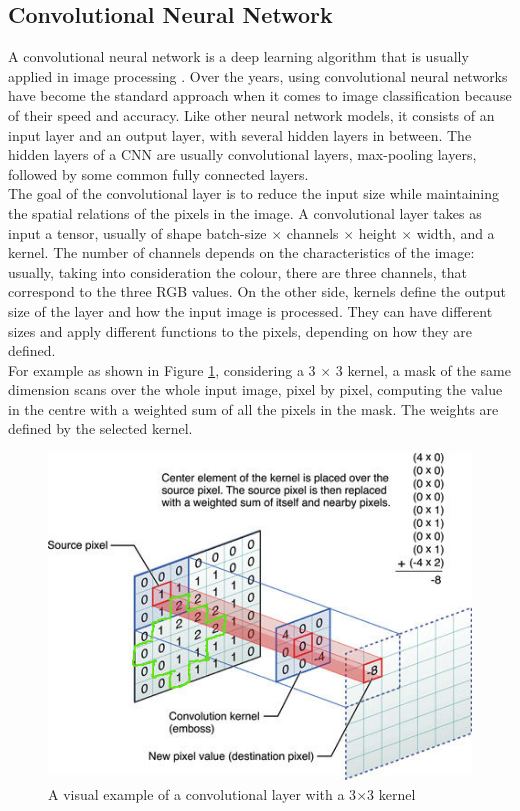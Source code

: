 \documentclass{usiinftr}
\begin{document}
\subsection{Convolutional Neural Network} 
A convolutional neural network is a deep learning algorithm that is usually applied in image processing \cite{14}.
Over the years, using convolutional neural networks have become the standard approach when it comes to image classification because of their speed and accuracy.
Like other neural network models, it consists of an input layer and an output layer, with several hidden layers in between.
The hidden layers of a CNN are usually convolutional layers, max-pooling layers, followed by some common fully connected layers.\\
The goal of the convolutional layer is to reduce the input size while maintaining the spatial relations of the pixels in the image. A convolutional layer takes as input a tensor, usually of shape batch-size $\times$ channels $\times$ height $\times$ width, and a kernel. The number of channels depends on the characteristics of the image: usually, taking into consideration the colour, there are three channels, that correspond to the three RGB values. 
On the other side, kernels define the output size of the layer and how the input image is processed. They can have different sizes and apply different functions to the pixels, depending on how they are defined.  \\
For example as shown in Figure \ref{fig:13}, considering a 3 $\times$ 3 kernel, a mask of the same dimension scans over the whole input image, pixel by pixel, computing the value in the centre with a weighted sum of all the pixels in the mask. The weights are defined by the selected kernel.

\begin{figure}[H]
	\centering
	\includegraphics[width=0.5\linewidth]{img/kernel}
	\caption{A visual example of a convolutional layer with a 3$\times$3 kernel \cite{15}}
	\label{fig:13}
\end{figure}
\end{document}

